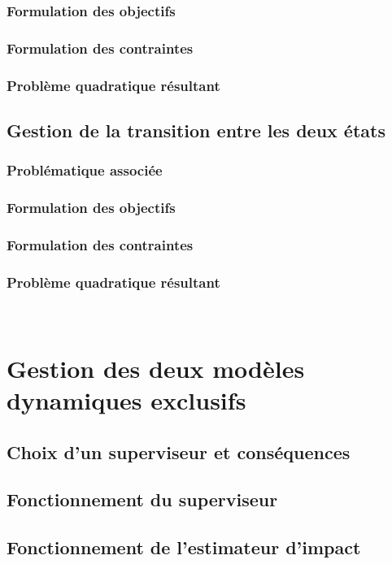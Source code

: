 			\subsubsection{Formulation des objectifs}
			\subsubsection{Formulation des contraintes}
			\subsubsection{Problème quadratique résultant}
		\subsection{Gestion de la transition entre les deux états}
			\subsubsection{Problématique associée}
			\subsubsection{Formulation des objectifs}
			\subsubsection{Formulation des contraintes}
			\subsubsection{Problème quadratique résultant}
			
	~
			
	\section{Gestion des deux modèles dynamiques exclusifs}
		\subsection{Choix d'un superviseur et conséquences}
		\subsection{Fonctionnement du superviseur}
		\subsection{Fonctionnement de l'estimateur d'impact}
